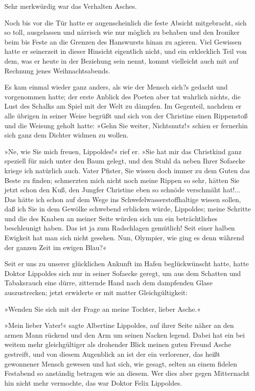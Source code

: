 Sehr merkwürdig war das Verhalten Asches.

Noch bis vor die Tür hatte er augenscheinlich die feste Absicht
mitgebracht, sich so toll, ausgelassen und närrisch wie nur möglich
zu behaben und den Ironiker beim bis Feste an die Grenzen des
Hanswursts hinan zu agieren. Viel Gewissen hatte er seinerzeit in
dieser Hinsicht eigentlich nicht, und ein erklecklich Teil von dem,
was er heute in der Beziehung sein nennt, kommt vielleicht auch mit
auf Rechnung jenes Weihnachtsabends.

Es kam einmal wieder ganz anders, als wie der Mensch sich?s gedacht
und vorgenommen hatte; der erste Anblick des Poeten aber tat
wahrlich nichts, die Lust des Schalks am Spiel mit der Welt zu
dämpfen. Im Gegenteil, nachdem er alle übrigen in seiner Weise
begrüßt und sich von der Christine einen Rippenstoß und die Weisung
geholt hatte: »Gehn Sie weiter, Nichtsnutz!« schien er fernerhin
sich ganz dem Dichter widmen zu wollen.

»Ne, wie Sie mich freuen, Lippoldes!« rief er. »Sie hat mir das
Christkind ganz speziell für mich unter den Baum gelegt, und den
Stuhl da neben Ihrer Sofaecke kriege ich natürlich auch. Vater
Pfister, Sie wissen doch immer zu dem Guten das Beste zu finden;
schmerzten mich nicht noch meine Rippen so sehr, hätten Sie jetzt
schon den Kuß, den Jungfer Christine eben so schnöde verschmäht
hat!... Das hätte ich schon auf dem Wege ins
Schwefelwasserstoffhaltige wissen sollen, daß ich Sie in dem
Gewölke schwebend erblicken würde, Lippoldes; meine Schritte und
die des Knaben an meiner Seite würden sich um ein beträchtliches
beschleunigt haben. Das ist ja zum Radschlagen gemütlich! Seit
einer halben Ewigkeit hat man sich nicht gesehen. Nun, Olympier,
wie ging es denn während der ganzen Zeit im ewigen Blau?«

Seit er uns zu unserer glücklichen Ankunft im Hafen beglückwünscht
hatte, hatte Doktor Lippoldes sich nur in seiner Sofaecke geregt,
um aus dem Schatten und Tabaksrauch eine dürre, zitternde Hand nach
dem dampfenden Glase auszustrecken; jetzt erwiderte er mit matter
Gleichgültigkeit:

»Wenden Sie sich mit der Frage an meine Tochter, lieber Asche.«

»Mein lieber Vater!« sagte Albertine Lippoldes, auf ihrer Seite
näher an den armen Mann rückend und den Arm um seinen Nacken
legend. Dabei hat ein bei weitem mehr gleichgültiger als drohender
Blick meinen guten Freund Asche gestreift, und von diesem
Augenblick an ist der ein verlorener, das heißt gewonnener Mensch
gewesen und hat sich, wie gesagt, selten an einem fidelen Festabend
so anständig betragen wie an diesem. Wer dies aber gegen
Mitternacht hin nicht mehr vermochte, das war Doktor Felix
Lippoldes.

